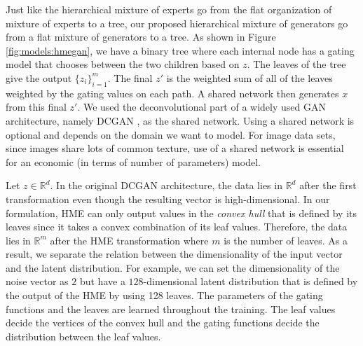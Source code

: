 \documentclass[a4paper,onesided,12pt]{report}
\begin{document}
Just like the hierarchical mixture of experts \cite{hme} go from the flat organization of mixture of experts  \cite{me} to a tree, our proposed hierarchical mixture of generators go from a flat mixture of generators to a tree. As shown in Figure \ref{fig:models:hmegan}, we have a binary tree where each internal node has a gating model that chooses between the two children based on $z$. The leaves of the tree give the output $\{z_i\}_{i=1}^m$. The final $z'$ is the weighted sum of all of the leaves weighted by the gating values on each path. A shared network then generates $x$ from this final $z'$.  We used the deconvolutional part of a widely used GAN architecture, namely DCGAN \cite{dcgan}, as the shared network. Using a shared network is optional and depends on the domain we want to model. For image data sets, since images share lots of common texture, use of a shared network is essential for an economic (in terms of number of parameters) model.

Let $z \in \mathbb{R}^{d}$. In the original DCGAN architecture, the data lies in $\mathbb{R}^{d}$ after the first transformation even though the resulting vector is high-dimensional. In our formulation, HME can only output values in the \emph{convex hull} that is defined by its leaves since it takes a convex combination of its leaf values. Therefore, the data lies in $\mathbb{R}^m$ after the HME transformation where $m$ is the number of leaves. As a result, we separate the relation between the dimensionality of the input vector and the latent distribution. For example, we can set the dimensionality of the noise vector as $2$ but have a $128$-dimensional latent distribution that is defined by the output of the HME by using 128 leaves. The parameters of the gating functions and the leaves are learned throughout the training. The leaf values decide the vertices of the convex hull and the gating functions decide the distribution between the leaf values.
\end{document}
